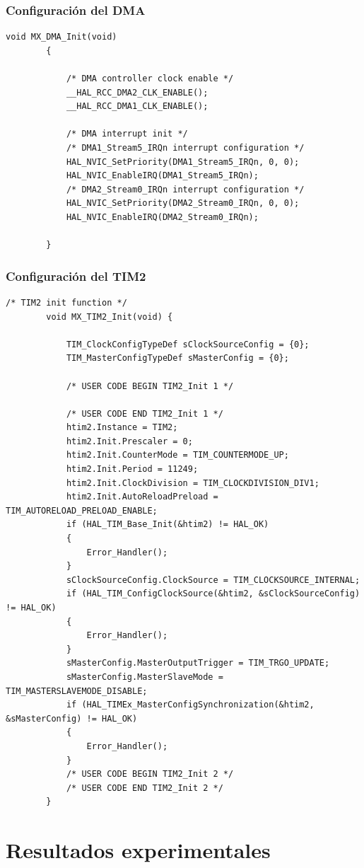 \documentclass[12pt]{article}
\begin{document}
	\subsubsection{Configuración del DMA}
	\begin{lstlisting}[style=mystyle]
		void MX_DMA_Init(void)
		{
			
			/* DMA controller clock enable */
			__HAL_RCC_DMA2_CLK_ENABLE();
			__HAL_RCC_DMA1_CLK_ENABLE();
			
			/* DMA interrupt init */
			/* DMA1_Stream5_IRQn interrupt configuration */
			HAL_NVIC_SetPriority(DMA1_Stream5_IRQn, 0, 0);
			HAL_NVIC_EnableIRQ(DMA1_Stream5_IRQn);
			/* DMA2_Stream0_IRQn interrupt configuration */
			HAL_NVIC_SetPriority(DMA2_Stream0_IRQn, 0, 0);
			HAL_NVIC_EnableIRQ(DMA2_Stream0_IRQn);
			
		}
	\end{lstlisting}
	
	\subsubsection{Configuración del TIM2}
	\begin{lstlisting}[style=mystyle]
		/* TIM2 init function */
		void MX_TIM2_Init(void)	{
			
			TIM_ClockConfigTypeDef sClockSourceConfig = {0};
			TIM_MasterConfigTypeDef sMasterConfig = {0};
			
			/* USER CODE BEGIN TIM2_Init 1 */
			
			/* USER CODE END TIM2_Init 1 */
			htim2.Instance = TIM2;
			htim2.Init.Prescaler = 0;
			htim2.Init.CounterMode = TIM_COUNTERMODE_UP;
			htim2.Init.Period = 11249;
			htim2.Init.ClockDivision = TIM_CLOCKDIVISION_DIV1;
			htim2.Init.AutoReloadPreload = TIM_AUTORELOAD_PRELOAD_ENABLE;
			if (HAL_TIM_Base_Init(&htim2) != HAL_OK)
			{
				Error_Handler();
			}
			sClockSourceConfig.ClockSource = TIM_CLOCKSOURCE_INTERNAL;
			if (HAL_TIM_ConfigClockSource(&htim2, &sClockSourceConfig) != HAL_OK)
			{
				Error_Handler();
			}
			sMasterConfig.MasterOutputTrigger = TIM_TRGO_UPDATE;
			sMasterConfig.MasterSlaveMode = TIM_MASTERSLAVEMODE_DISABLE;
			if (HAL_TIMEx_MasterConfigSynchronization(&htim2, &sMasterConfig) != HAL_OK)
			{
				Error_Handler();
			}
			/* USER CODE BEGIN TIM2_Init 2 */
			/* USER CODE END TIM2_Init 2 */	
		}
	\end{lstlisting}
	
	\section{Resultados experimentales}
\end{document}
